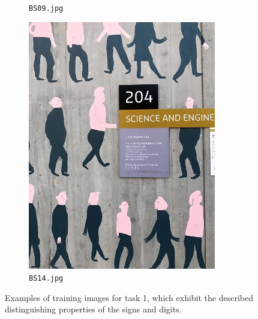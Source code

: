 \documentclass{article}
\begin{document}
\begin{figure}[h]
\begin{subfigure}[h]{0.22\textwidth}
    \caption[BS09]{
      \lstinline{BS09.jpg}
    }
    \label{fig:bs09}
  \end{subfigure}
  \begin{subfigure}[h]{0.22\textwidth}
    \centering
    \includegraphics[width=0.9\textwidth]{../train/task1/BS14}
    \caption[BS14]{
      \lstinline{BS14.jpg}
    }
    \label{fig:bs14}
  \end{subfigure}

  \caption[Task 1 - Regular Cases]{
    Examples of training images for task 1, which exhibit the described
    distinguishing properties of the signs and digits.
  }
  \label{fig:problem-1-regular}
\end{figure}
\end{document}
